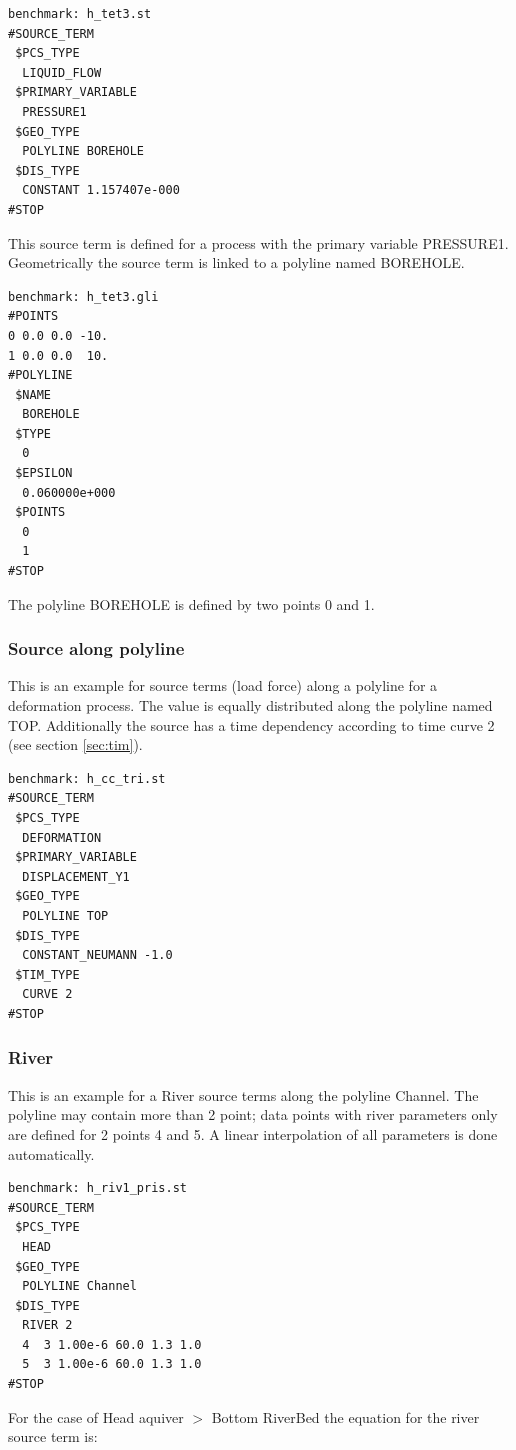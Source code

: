{\begin{verbatim}
benchmark: h_tet3.st
#SOURCE_TERM
 $PCS_TYPE
  LIQUID_FLOW
 $PRIMARY_VARIABLE
  PRESSURE1
 $GEO_TYPE
  POLYLINE BOREHOLE
 $DIS_TYPE
  CONSTANT 1.157407e-000
#STOP
\end{verbatim}

This source term is defined for a process with the primary
variable PRESSURE1. Geometrically the source term is linked to a
polyline named BOREHOLE.

\begin{verbatim}
benchmark: h_tet3.gli
#POINTS
0 0.0 0.0 -10.
1 0.0 0.0  10.
#POLYLINE
 $NAME
  BOREHOLE
 $TYPE
  0
 $EPSILON
  0.060000e+000
 $POINTS
  0
  1
#STOP
\end{verbatim}

The polyline BOREHOLE is defined by two points 0 and 1.

\subsubsection{Source along polyline}

This is an example for source terms (load force) along a polyline
for a deformation process. The value is equally distributed along
the polyline named TOP. Additionally the source has a time
dependency according to time curve 2 (see section \ref{sec:tim}).

\begin{verbatim}
benchmark: h_cc_tri.st
#SOURCE_TERM
 $PCS_TYPE
  DEFORMATION
 $PRIMARY_VARIABLE
  DISPLACEMENT_Y1
 $GEO_TYPE
  POLYLINE TOP
 $DIS_TYPE
  CONSTANT_NEUMANN -1.0
 $TIM_TYPE
  CURVE 2
#STOP
\end{verbatim}

\subsubsection{River}
This is an example for a River source terms along the polyline
Channel. The polyline may contain more than 2 point; data points
with river parameters only are defined for 2 points 4 and 5. A
linear interpolation of all parameters is done automatically.

\begin{verbatim}
benchmark: h_riv1_pris.st
#SOURCE_TERM
 $PCS_TYPE
  HEAD
 $GEO_TYPE
  POLYLINE Channel
 $DIS_TYPE
  RIVER 2
  4  3 1.00e-6 60.0 1.3 1.0
  5  3 1.00e-6 60.0 1.3 1.0
#STOP
\end{verbatim}

For the case of Head aquiver $ > $ Bottom RiverBed the equation
for the river source term is:

}
